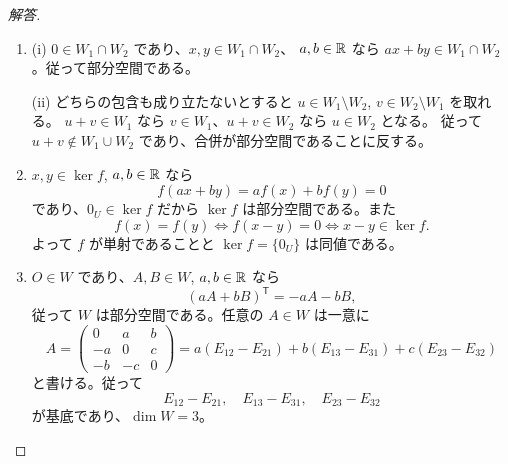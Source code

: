 \begin{proof}[解答]
\begin{enumerate}
  \item[(1)] (i) $0\in W_1\cap W_2$ であり、$x,y\in W_1\cap W_2$、
  $a,b\in\mathbb{R}$ なら $ax+by\in W_1\cap W_2$。従って部分空間である。

  (ii) どちらの包含も成り立たないとすると
  $u\in W_1\setminus W_2$, $v\in W_2\setminus W_1$ を取れる。
  $u+v\in W_1$ なら $v\in W_1$、$u+v\in W_2$ なら $u\in W_2$ となる。
  従って $u+v\notin W_1\cup W_2$ であり、合併が部分空間であることに反する。

  \item[(2)] $x,y\in\ker f$, $a,b\in\mathbb{R}$ なら
  \[
  f(ax+by)=af(x)+bf(y)=0
  \]
  であり、$0_U\in\ker f$ だから $\ker f$ は部分空間である。また
  \[
  f(x)=f(y)\iff f(x-y)=0\iff x-y\in\ker f.
  \]
  よって $f$ が単射であることと $\ker f=\{0_U\}$ は同値である。

  \item[(3)] $O\in W$ であり、$A,B\in W$, $a,b\in\mathbb{R}$ なら
  \[
  (aA+bB)^{\mathsf T}=-aA-bB,
  \]
  従って $W$ は部分空間である。任意の $A\in W$ は一意に
  \[
  A=\begin{pmatrix}0&a&b\\-a&0&c\\-b&-c&0\end{pmatrix}
  =a(E_{12}-E_{21})+b(E_{13}-E_{31})+c(E_{23}-E_{32})
  \]
  と書ける。従って
  \[
  E_{12}-E_{21},\quad E_{13}-E_{31},\quad E_{23}-E_{32}
  \]
  が基底であり、$\dim W=3$。
\end{enumerate}
\end{proof}

